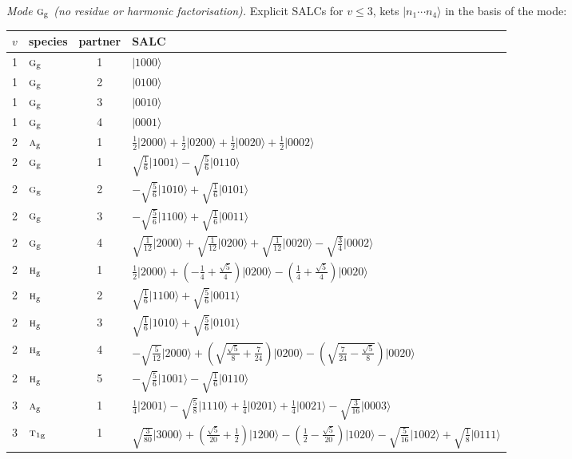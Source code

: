 \documentclass[11pt]{article}
\newcommand{\irr}[1]{\text{\normalfont\scshape #1}}
\newcommand{\ptag}[1]{\mathrm{#1}}
\newcommand{\occ}[1]{\lvert #1\rangle}
\begin{document}
\emph{Mode $\irr{g}_{\ptag{g}}$ (no residue or harmonic factorisation).} Explicit SALCs for $v\le3$, kets $\occ{n_1\cdots n_{4}}$ in the basis of the mode:
\begin{longtable}{c l c p{}}\hline $v$ & species & partner & SALC\\ \hline\endhead
1 & $\irr{g}_{\ptag{g}}$ & 1 & $\occ{1000}$\\
1 & $\irr{g}_{\ptag{g}}$ & 2 & $\occ{0100}$\\
1 & $\irr{g}_{\ptag{g}}$ & 3 & $\occ{0010}$\\
1 & $\irr{g}_{\ptag{g}}$ & 4 & $\occ{0001}$\\
\hline
2 & $\irr{a}_{\ptag{g}}$ & 1 & $\tfrac{1}{2}\occ{2000}+\tfrac{1}{2}\occ{0200}+\tfrac{1}{2}\occ{0020}+\tfrac{1}{2}\occ{0002}$\\
2 & $\irr{g}_{\ptag{g}}$ & 1 & $\sqrt{\tfrac{1}{6}}\occ{1001}-\sqrt{\tfrac{5}{6}}\occ{0110}$\\
2 & $\irr{g}_{\ptag{g}}$ & 2 & $-\sqrt{\tfrac{5}{6}}\occ{1010}+\sqrt{\tfrac{1}{6}}\occ{0101}$\\
2 & $\irr{g}_{\ptag{g}}$ & 3 & $-\sqrt{\tfrac{5}{6}}\occ{1100}+\sqrt{\tfrac{1}{6}}\occ{0011}$\\
2 & $\irr{g}_{\ptag{g}}$ & 4 & $\sqrt{\tfrac{1}{12}}\occ{2000}+\sqrt{\tfrac{1}{12}}\occ{0200}+\sqrt{\tfrac{1}{12}}\occ{0020}-\sqrt{\tfrac{3}{4}}\occ{0002}$\\
2 & $\irr{h}_{\ptag{g}}$ & 1 & $\tfrac{1}{2}\occ{2000}+(- \frac{1}{4} + \frac{\sqrt{5}}{4})\occ{0200}-(\frac{1}{4} + \frac{\sqrt{5}}{4})\occ{0020}$\\
2 & $\irr{h}_{\ptag{g}}$ & 2 & $\sqrt{\tfrac{1}{6}}\occ{1100}+\sqrt{\tfrac{5}{6}}\occ{0011}$\\
2 & $\irr{h}_{\ptag{g}}$ & 3 & $\sqrt{\tfrac{1}{6}}\occ{1010}+\sqrt{\tfrac{5}{6}}\occ{0101}$\\
2 & $\irr{h}_{\ptag{g}}$ & 4 & $-\sqrt{\tfrac{5}{12}}\occ{2000}+(\sqrt{\frac{\sqrt{5}}{8} + \frac{7}{24}})\occ{0200}-(\sqrt{\frac{7}{24} - \frac{\sqrt{5}}{8}})\occ{0020}$\\
2 & $\irr{h}_{\ptag{g}}$ & 5 & $-\sqrt{\tfrac{5}{6}}\occ{1001}-\sqrt{\tfrac{1}{6}}\occ{0110}$\\
\hline
3 & $\irr{a}_{\ptag{g}}$ & 1 & $\tfrac{1}{4}\occ{2001}-\sqrt{\tfrac{5}{8}}\occ{1110}+\tfrac{1}{4}\occ{0201}+\tfrac{1}{4}\occ{0021}-\sqrt{\tfrac{3}{16}}\occ{0003}$\\
3 & $\irr{t}_{1\ptag{g}}$ & 1 & $\sqrt{\tfrac{3}{80}}\occ{3000}+(\frac{\sqrt{5}}{20} + \frac{1}{2})\occ{1200}-(\frac{1}{2} - \frac{\sqrt{5}}{20})\occ{1020}-\sqrt{\tfrac{5}{16}}\occ{1002}+\sqrt{\tfrac{1}{8}}\occ{0111}$\\

\end{longtable}
\end{document}
